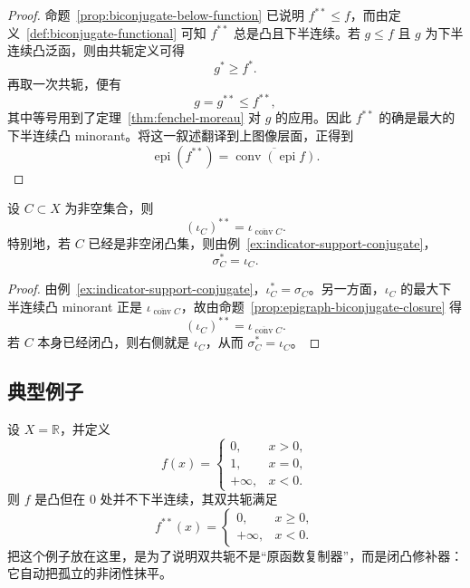 \begin{proof}
命题~\ref{prop:biconjugate-below-function} 已说明 $f^{\ast\ast}\le f$，而由定义~\ref{def:biconjugate-functional} 可知 $f^{\ast\ast}$ 总是凸且下半连续。若 $g\le f$ 且 $g$ 为下半连续凸泛函，则由共轭定义可得
\[
g^\ast\ge f^\ast.
\]
再取一次共轭，便有
\[
g=g^{\ast\ast}\le f^{\ast\ast},
\]
其中等号用到了定理~\ref{thm:fenchel-moreau} 对 $g$ 的应用。因此 $f^{\ast\ast}$ 的确是最大的下半连续凸 minorant。将这一叙述翻译到上图像层面，正得到
\[
\operatorname{epi}(f^{\ast\ast})=\overline{\operatorname{conv}(\operatorname{epi}f)}.
\]
\end{proof}

\begin{corollary}\label{cor:indicator-support-bipolar}
设 $C\subset X$ 为非空集合，则
\[
(\iota_C)^{\ast\ast}=\iota_{\overline{\operatorname{conv}}C}.
\]
特别地，若 $C$ 已经是非空闭凸集，则由例~\ref{ex:indicator-support-conjugate}，
\[
\sigma_C^\ast=\iota_C.
\]
\end{corollary}

\begin{proof}
由例~\ref{ex:indicator-support-conjugate}，$\iota_C^\ast=\sigma_C$。另一方面，$\iota_C$ 的最大下半连续凸 minorant 正是 $\iota_{\overline{\operatorname{conv}}C}$，故由命题~\ref{prop:epigraph-biconjugate-closure} 得
\[
(\iota_C)^{\ast\ast}=\iota_{\overline{\operatorname{conv}}C}.
\]
若 $C$ 本身已经闭凸，则右侧就是 $\iota_C$，从而 $\sigma_C^\ast=\iota_C$。
\end{proof}

\subsection{典型例子}

\begin{example}[非闭凸函数的双共轭正则化]
设 $X=\mathbb R$，并定义
\[
f(x)=
\begin{cases}
0, & x>0,\\
1, & x=0,\\
+\infty, & x<0.
\end{cases}
\]
则 $f$ 是凸但在 $0$ 处并不下半连续，其双共轭满足
\[
f^{\ast\ast}(x)=
\begin{cases}
0, & x\ge 0,\\
+\infty, & x<0.
\end{cases}
\]
把这个例子放在这里，是为了说明双共轭不是“原函数复制器”，而是闭凸修补器：它自动把孤立的非闭性抹平。
\end{example}

